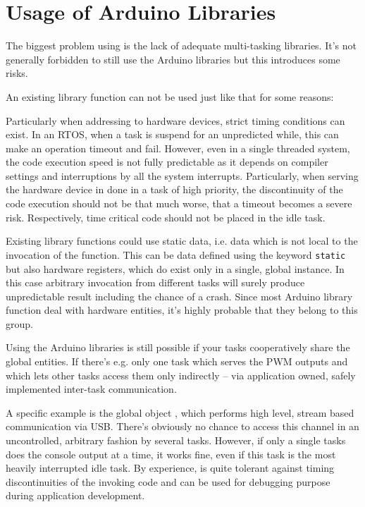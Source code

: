 \section{Usage of Arduino Libraries}

The biggest problem using \rtos{} is the lack of adequate multi-tasking
libraries. It's not generally forbidden to still use the Arduino libraries
but this introduces some risks. 

An existing library function can not be used just like that for some
reasons:

Particularly when addressing to hardware devices, strict timing conditions
can exist. In an RTOS, when a task is suspend for an unpredicted while,
this can make an operation timeout and fail. However, even in a single
threaded system, the code execution speed is not fully predictable as it
depends on compiler settings and interruptions by all the system
interrupts. Particularly, when serving the hardware device in done in a
task of high priority, the discontinuity of the code execution should not
be that much worse, that a timeout becomes a severe risk. Respectively,
time critical code should not be placed in the idle task.

Existing library functions could use static data, i.e. data which is not
local to the invocation of the function. This can be data defined using
the keyword \verb+static+ but also hardware registers, which do exist only
in a single, global instance. In this case arbitrary invocation from
different tasks will surely produce unpredictable result including the
chance of a crash. Since most Arduino library function deal with hardware
entities, it's highly probable that they belong to this group.

Using the Arduino libraries is still possible if your tasks cooperatively
share the global entities. If there's e.g. only one task which serves the
PWM outputs and which lets other tasks access them only indirectly -- via
application owned, safely implemented inter-task communication.

A specific example is the global object , which performs
high level, stream based communication via USB. There's obviously no
chance to access this channel in an uncontrolled, arbitrary fashion by
several tasks. However, if only a single tasks does the console output at
a time, it works fine, even if this task is the most heavily interrupted
idle task. By experience,  is quite tolerant against timing
discontinuities of the invoking code and can be used for debugging purpose
during application development.

